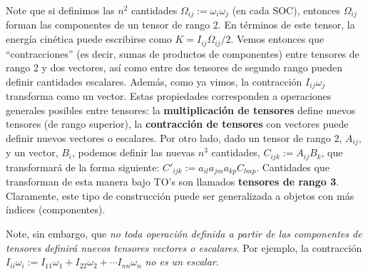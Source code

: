 Note que si definimos las $n^2$ cantidades $\Omega_{ij}:=\omega_i\omega_j$ (en cada SOC), entonces $\Omega_{ij}$ forman las componentes de un tensor de rango 2. En términos de este tensor, la energía cinética puede escribirse como $K=I_{ij}\Omega_{ij}/2$. Vemos entonces que ``contracciones'' (es decir, sumas de productos de componentes) entre tensores de rango 2 y dos vectores, así como entre dos tensores de segundo rango pueden definir cantidades escalares. Además, como ya vimos, la contracción $I_{ij}\omega_j$ transforma como un vector. Estas propiedades corresponden a operaciones generales posibles entre tensores: la \textbf{multiplicación de tensores} define nuevos tensores (de rango superior), la \textbf{contracción de tensores} con vectores puede definir nuevos vectores o escalares. Por otro lado, dado un tensor de rango 2, $A_{ij}$, y un vector, $B_i$, podemos definir las nuevas $n^3$ cantidades, $C_{ijk}:=A_{ij}B_k$, que transformará de la forma siguiente: $C'_{ijk}:=a_{il}a_{jm}a_{kp}C_{lmp}$. Cantidades que transforman de esta manera bajo TO's son llamados \textbf{tensores de rango 3}. Claramente, este tipo de construcción puede ser generalizada a objetos con más índices (componentes). 

 Note, sin embargo, que \textit{no toda operación definida a partir de las componentes de tensores definirá nuevos tensores vectores o escalares}. Por ejemplo, la contracción $I_{ii}\omega_i:=I_{11}\omega_1+I_{22}\omega_2+\cdots I_{nn}\omega_n$ \textit{no es un escalar}.

